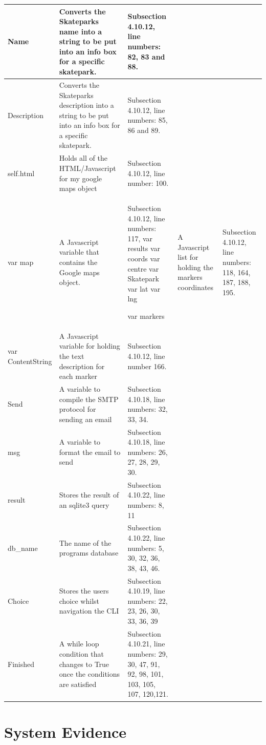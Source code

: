 \begin{center}
\begin{longtable}{|p{5cm}|p{6cm}|p{3.5cm}|}
Name & Converts the Skateparks name into a string to be put into an info box for a specific skatepark. & Subsection 4.10.12, line numbers: 82, 83 and 88. \\ \hline
Description & Converts the Skateparks description into a string to be put into an info box for a specific skatepark. & Subsection 4.10.12, line numbers: 85, 86 and 89. \\ \hline

self.html & Holds all of the HTML/Javascript for my google maps object & Subsection 4.10.12, line number: 100. \\ \hline

var map & A Javascript variable that contains the Google maps object. & Subsection 4.10.12, line numbers: 117,
var results
var coords
var centre
var Skatepark
var lat
var lng

var markers & A Javascript list for holding the markers coordinates & Subsection 4.10.12, line numbers: 118, 164, 187, 188, 195. \\ \hline
var ContentString & A Javascript variable for holding the text description for each marker & Subsection 4.10.12, line number 166. \\ \hline
Send & A variable to compile the SMTP protocol for sending an email & Subsection 4.10.18, line numbers: 32, 33, 34.  \\ \hline
msg & A variable to format the email to send & Subsection 4.10.18, line numbers: 26, 27, 28, 29, 30. \\ \hline
result & Stores the result of an sqlite3 query & Subsection 4.10.22, line numbers: 8, 11 \\ \hline
db\_name & The name of the programs database & Subsection 4.10.22, line numbers: 5, 30, 32, 36, 38, 43, 46.\\ \hline 
Choice & Stores the users choice whilst navigation the CLI & Subsection 4.10.19, line numbers: 22, 23, 26, 30, 33, 36, 39\\ \hline 
Finished & A while loop condition that changes to True once the conditions are satisfied & Subsection 4.10.21, line numbers: 29, 30, 47, 91, 92, 98, 101, 103, 105, 107, 120,121. \\ \hline



\end{longtable}
\label{tab:Variable List}
\end{center}






\section{System Evidence}

